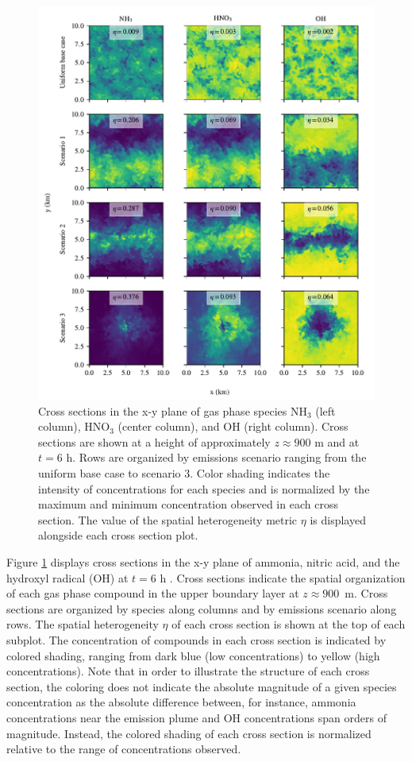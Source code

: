 \documentclass[journal abbreviation, manuscript]{copernicus}
\begin{document}
\begin{figure}[!h]
	\centering
	\includegraphics[]{figures/gas-spatial-heterogeneity-time36-z45.pdf}
	\caption{Cross sections in the x-y plane of gas phase species NH$_3$ (left column), HNO$_3$ (center column), and OH (right column). Cross sections are shown at a height of approximately $z\approx900$ m and at $t=6$ h. Rows are organized by emissions scenario ranging from the uniform base case to scenario 3. Color shading indicates the intensity of concentrations for each species and is normalized by the maximum and minimum concentration observed in each cross section. The value of the spatial heterogeneity metric $\eta$ is displayed alongside each cross section plot.}
	\label{fig:gas-cross-sec}
\end{figure} 

Figure \ref{fig:gas-cross-sec} displays cross sections in the x-y plane of ammonia, nitric acid, and the hydroxyl radical (OH) at $t=6$ h . Cross sections indicate the spatial organization of each gas phase compound in the upper boundary layer at  $z\approx900$~m. Cross sections are organized by species along columns and by emissions scenario along rows. The spatial heterogeneity $\eta$ of each cross section is shown at the top of each subplot. The concentration of compounds in each cross section is indicated by colored shading, ranging from dark blue (low concentrations) to yellow (high concentrations). Note that in order to illustrate the structure of each cross section, the coloring does not indicate the absolute magnitude of a given species concentration as the absolute difference between, for instance, ammonia concentrations near the emission plume and OH concentrations span orders of magnitude. Instead, the colored shading of each cross section is normalized relative to the range of concentrations observed. 
\end{document}
